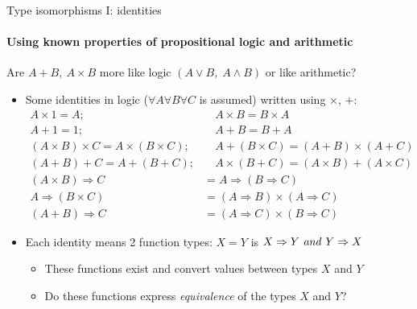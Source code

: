 \documentclass[english]{beamer}
\begin{document}
\begin{frame}{Type isomorphisms I: identities}


\framesubtitle{Using known properties of propositional logic and arithmetic}

Are $A+B,\:A\times B$ more like logic $\left(A\vee B,\;A\wedge B\right)$
or like arithmetic?
\begin{itemize}
\item Some identities in logic ($\forall A\forall B\forall C$ is assumed)
written using $\times$, $+$:
\begin{align*}
A\times1=A; & \quad A\times B=B\times A\\
A+1=1; & \quad A+B=B+A\\
(A\times B)\times C=A\times(B\times C); & \quad A+(B\times C)=(A+B)\times(A+C)\\
(A+B)+C=A+(B+C); & \quad A\times(B+C)=(A\times B)+(A\times C)\\
(A\times B)\Rightarrow C & =A\Rightarrow(B\Rightarrow C)\\
A\Rightarrow(B\times C) & =(A\Rightarrow B)\times(A\Rightarrow C)\\
(A+B)\Rightarrow C & =(A\Rightarrow C)\times(B\Rightarrow C)
\end{align*}
\item Each identity means 2 function types: $X=Y$ is $X\Rightarrow Y\text{ \emph{and} }Y\Rightarrow X$ 
\begin{itemize}
\item These functions exist and convert values between types $X$ and $Y$
\item Do these functions express \emph{equivalence} of the types $X$ and
$Y$?
\end{itemize}
\end{itemize}
\end{frame}
\end{document}
